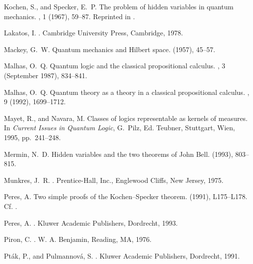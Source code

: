 \begin{thebibliography}{10}
{\sc Kochen, S., and Specker, E.~P.}
\newblock The problem of hidden variables in quantum mechanics.
, 1 (1967), 59--87.
\newblock Reprinted in \cite[pp. 235--263]{specker-ges}.

{\sc Lakatos, I.}
.
\newblock Cambridge University Press, Cambridge, 1978.

{\sc Mackey, G.~W.}
\newblock Quantum mechanics and {H}ilbert space.
 (1957), 45--57.

{\sc Malhas, O.~Q.}
\newblock Quantum logic and the classical propositional calculus.
, 3 (September 1987), 834--841.

{\sc Malhas, O.~Q.}
\newblock Quantum theory as a theory in a classical propositional calculus.
, 9 (1992),
  1699--1712.

{\sc Mayet, R., and Navara, M.}
\newblock Classes of logics representable as kernels of measures.
\newblock In {\em Current Issues in Quantum Logic}, G.~Pilz, Ed. Teubner,
  Stuttgart, Wien, 1995, pp.~241--248.

{\sc Mermin, N.~D.}
\newblock Hidden variables and the two theorems of {J}ohn {B}ell.
 (1993), 803--815.

{\sc Munkres, J.~R.}
.
\newblock Prentice-Hall, Inc., Englewood Cliffs, New Jersey, 1975.

{\sc Peres, A.}
\newblock Two simple proofs of the {K}ochen--{S}pecker theorem.
 (1991), L175--L178.
\newblock Cf. \cite[pp. 186-200]{peres}.

{\sc Peres, A.}
.
\newblock Kluwer Academic Publishers, Dordrecht, 1993.

{\sc Piron, C.}
.
\newblock W. A. Benjamin, Reading, MA, 1976.

{\sc Pt{\'{a}}k, P., and Pulmannov{\'{a}}, S.}
.
\newblock Kluwer Academic Publishers, Dordrecht, 1991.


\end{thebibliography}
